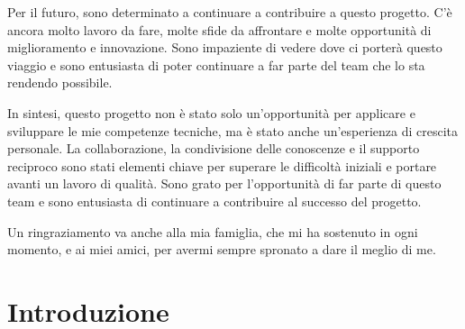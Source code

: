 \documentclass[target=bach,aauheader=,style=]{thud}
\begin{document}
Per il futuro, sono determinato a continuare a contribuire a questo progetto. C'è ancora molto lavoro da fare, molte sfide da affrontare e molte opportunità di miglioramento e innovazione. Sono impaziente di vedere dove ci porterà questo viaggio e sono entusiasta di poter continuare a far parte del team che lo sta rendendo possibile.


In sintesi, questo progetto non è stato solo un'opportunità per applicare e sviluppare le mie competenze tecniche, ma è stato anche un'esperienza di crescita personale. La collaborazione, la condivisione delle conoscenze e il supporto reciproco sono stati elementi chiave per superare le difficoltà iniziali e portare avanti un lavoro di qualità. Sono grato per l'opportunità di far parte di questo team e sono entusiasta di continuare a contribuire al successo del progetto.


Un ringraziamento va anche alla mia famiglia, che mi ha sostenuto in ogni momento, e ai miei amici, per avermi sempre spronato a dare il meglio di me.


\tableofcontents


\listoffigures

\mainmatter


\chapter{Introduzione}
\end{document}

